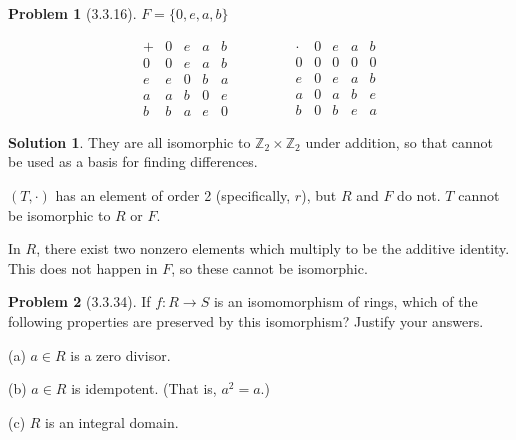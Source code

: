 \documentclass[12pt]{article}
\theoremstyle{definition}
\newtheorem*{prob}{Problem}
\newtheorem*{soln}{Solution}
\newcommand{\ZZ}{{\mathbb{Z}}}
\begin{document}
\begin{prob}[3.3.16]
$F = \{ 0, e, a, b \}$

\[
\begin{array}{c|cccc}
+ & 0 & e & a & b \\
\hline
0      & 0 & e & a & b  \\
e      & e & 0 & b & a  \\
a      & a & b & 0 & e  \\
b      & b & a & e & 0 
\end{array}
\qquad\qquad
\begin{array}{c|cccc}
\cdot & 0 & e & a & b \\
\hline
0      & 0 & 0 & 0 & 0  \\
e      & 0 & e & a & b  \\
a      & 0 & a & b & e  \\
b      & 0 & b & e & a 
\end{array}
\]
\end{prob}

\begin{soln}

They are all isomorphic to $\ZZ_2\times\ZZ_2$ under addition,
so that cannot be used as a basis for finding differences.

$(T,\cdot)$ has an element of order 2 (specifically, $r$),
but $R$ and $F$ do not.
$T$ cannot be isomorphic to $R$ or $F$.

In $R$, there exist two nonzero elements
which multiply to be the additive identity.
This does not happen in $F$,
so these cannot be isomorphic.

\end{soln}

\begin{prob}[3.3.34]
If  $f:R \to S$ is an isomomorphism of  rings, which of  the following properties are 
preserved by this isomorphism? Justify your answers.     

(a) $a\in R$ is a zero divisor.

(b) $a\in R$ is idempotent. (That is, $a^2=a$.)

(c) $R$ is an integral domain.
\end{prob}
\end{document}
